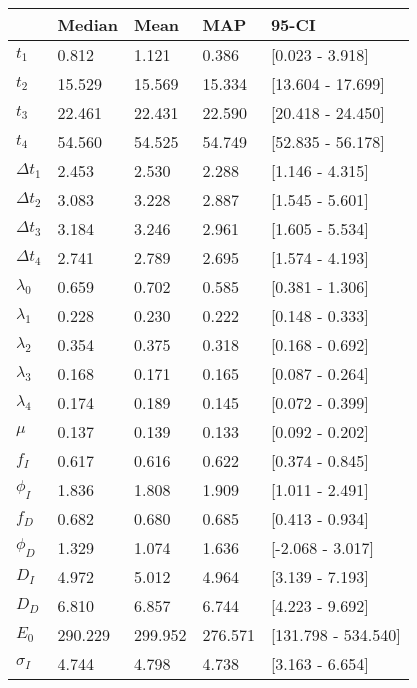 \begin{tabular}{lllll}
\toprule
{} &   Median &     Mean &      MAP &                95-CI \\
\midrule
$t_1$        &    0.812 &    1.121 &    0.386 &      [0.023 - 3.918] \\
$t_2$        &   15.529 &   15.569 &   15.334 &    [13.604 - 17.699] \\
$t_3$        &   22.461 &   22.431 &   22.590 &    [20.418 - 24.450] \\
$t_4$        &   54.560 &   54.525 &   54.749 &    [52.835 - 56.178] \\
$\Delta t_1$ &    2.453 &    2.530 &    2.288 &      [1.146 - 4.315] \\
$\Delta t_2$ &    3.083 &    3.228 &    2.887 &      [1.545 - 5.601] \\
$\Delta t_3$ &    3.184 &    3.246 &    2.961 &      [1.605 - 5.534] \\
$\Delta t_4$ &    2.741 &    2.789 &    2.695 &      [1.574 - 4.193] \\
$\lambda_0$  &    0.659 &    0.702 &    0.585 &      [0.381 - 1.306] \\
$\lambda_1$  &    0.228 &    0.230 &    0.222 &      [0.148 - 0.333] \\
$\lambda_2$  &    0.354 &    0.375 &    0.318 &      [0.168 - 0.692] \\
$\lambda_3$  &    0.168 &    0.171 &    0.165 &      [0.087 - 0.264] \\
$\lambda_4$  &    0.174 &    0.189 &    0.145 &      [0.072 - 0.399] \\
$\mu$        &    0.137 &    0.139 &    0.133 &      [0.092 - 0.202] \\
$f_I$        &    0.617 &    0.616 &    0.622 &      [0.374 - 0.845] \\
$\phi_I$     &    1.836 &    1.808 &    1.909 &      [1.011 - 2.491] \\
$f_D$        &    0.682 &    0.680 &    0.685 &      [0.413 - 0.934] \\
$\phi_D$     &    1.329 &    1.074 &    1.636 &     [-2.068 - 3.017] \\
$D_I$        &    4.972 &    5.012 &    4.964 &      [3.139 - 7.193] \\
$D_D$        &    6.810 &    6.857 &    6.744 &      [4.223 - 9.692] \\
$E_0$        &  290.229 &  299.952 &  276.571 &  [131.798 - 534.540] \\
$\sigma_I$   &    4.744 &    4.798 &    4.738 &      [3.163 - 6.654] \\

\end{tabular}
